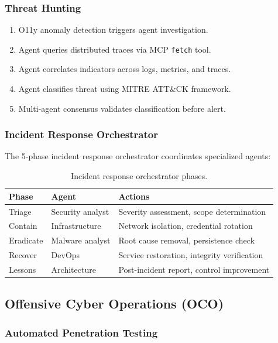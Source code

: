 \documentclass[11pt,letterpaper]{article}
\begin{document}
\subsubsection{Threat Hunting}

\begin{enumerate}
\item O11y anomaly detection triggers agent investigation.
\item Agent queries distributed traces via MCP \texttt{fetch} tool.
\item Agent correlates indicators across logs, metrics, and traces.
\item Agent classifies threat using MITRE ATT\&CK framework.
\item Multi-agent consensus validates classification before alert.
\end{enumerate}

\subsubsection{Incident Response Orchestrator}

The 5-phase incident response orchestrator coordinates specialized agents:

\begin{table}[H]
\centering
\begin{tabular}{@{}llp{5cm}@{}}
\toprule
\textbf{Phase} & \textbf{Agent} & \textbf{Actions} \\
\midrule
Triage & Security analyst & Severity assessment, scope determination \\
Contain & Infrastructure & Network isolation, credential rotation \\
Eradicate & Malware analyst & Root cause removal, persistence check \\
Recover & DevOps & Service restoration, integrity verification \\
Lessons & Architecture & Post-incident report, control improvement \\
\bottomrule
\end{tabular}
\caption{Incident response orchestrator phases.}
\label{tab:ir-phases}
\end{table}

\subsection{Offensive Cyber Operations (OCO)}

\subsubsection{Automated Penetration Testing}
\end{document}
